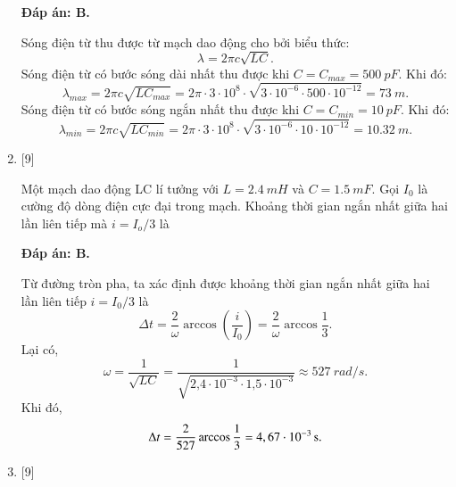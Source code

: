 \begin{enumerate}[label=\bfseries Câu \arabic*:]
	\hideall
	{		\textbf{Đáp án: B.}
		
		Sóng điện từ thu được từ mạch dao động cho bởi biểu thức:
		$$
		\lambda = 2\pi c \sqrt{LC}.
		$$ 
		Sóng điện từ có bước sóng dài nhất thu được khi $C = C_{max} =\SI{500}{pF}$. Khi đó:
		$$
		\lambda_{max} = 2\pi c \sqrt{LC_{max}} = 2\pi \cdot 3\cdot10^{8} \cdot \sqrt{3\cdot10^{-6} \cdot 500\cdot10^{-12}} = \SI{73}{m}.
		$$
		Sóng điện từ có bước sóng ngắn nhất thu được khi $C = C_{min} =\SI{10}{pF}$. Khi đó:
		$$
		\lambda_{min} = 2\pi c \sqrt{LC_{min}} = 2\pi \cdot 3\cdot10^{8} \cdot \sqrt{3\cdot10^{-6} \cdot 10\cdot10^{-12}} = \SI{10,32}{m}.
		$$
		
	}
	
	\item {} [9]
	
	{Một mạch dao động LC lí tưởng với $L = \SI{2,4}{mH}$ và $C = \SI{1,5}{mF}$. Gọi $I_0$ là cường độ dòng điện cực đại trong mạch. Khoảng thời gian ngắn nhất giữa hai lần liên tiếp mà $i = I_o /3$ là
	}
	
	\hideall
	{		\textbf{Đáp án: B.}
		
		Từ đường tròn pha, ta xác định được khoảng thời gian ngắn nhất giữa hai lần liên tiếp $i=I_{0} / 3$ là
		$$
		\Delta t=\dfrac{2}{\omega} \arccos \left(\dfrac{i}{I_{0}}\right)=\dfrac{2}{\omega} \arccos \dfrac{1}{3}.
		$$
		Lại có,
		$$
		\omega=\dfrac{1}{\sqrt{L C}}=\dfrac{1}{\sqrt{\text{2,4}\cdot10^{-3} \cdot \text{1,5} \cdot 10^{-3}}} \approx \SI{527}{rad/s}.
		$$
		Khi đó,
		$$
		\Delta t=\dfrac{2}{527} \arccos \dfrac{1}{3}= \xsi{4,67\cdot10^{-3}}{s}.
		$$
		
		
	}
	
	\item {} [9]
	

\end{enumerate}
